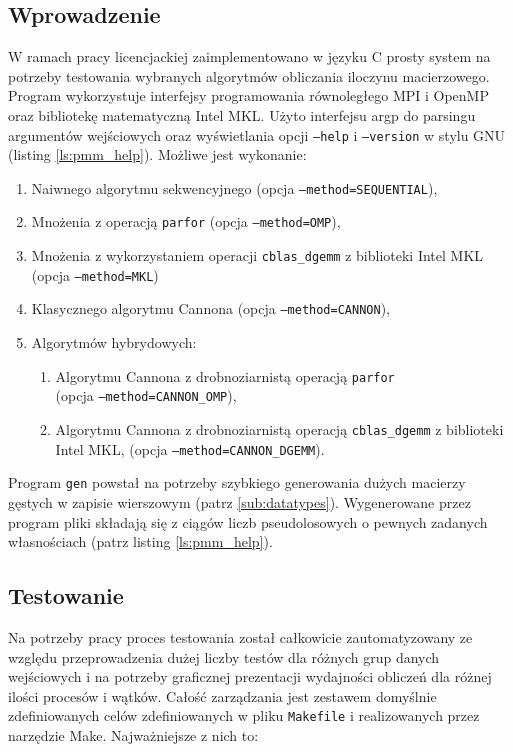 \subsection{Wprowadzenie}
W ramach pracy licencjackiej zaimplementowano w języku C prosty system na potrzeby testowania wybranych algorytmów obliczania iloczynu macierzowego. Program wykorzystuje interfejsy programowania równoległego MPI i OpenMP oraz bibliotekę matematyczną Intel MKL. Użyto interfejsu argp do parsingu argumentów wejściowych oraz wyświetlania opcji \texttt{--help} i \texttt{--version} w stylu GNU (listing \ref{ls:pmm_help}). Możliwe jest wykonanie:
\begin{enumerate}
\item Naiwnego algorytmu sekwencyjnego (opcja \texttt{--method=SEQUENTIAL}),
\item Mnożenia z operacją \texttt{parfor} (opcja \texttt{--method=OMP}),
\item Mnożenia z wykorzystaniem operacji \texttt{cblas\_dgemm} z biblioteki Intel MKL (opcja \texttt{--method=MKL})
\item Klasycznego algorytmu Cannona (opcja \texttt{--method=CANNON}),
\item Algorytmów hybrydowych:
\begin{enumerate}
\item Algorytmu Cannona z drobnoziarnistą operacją \texttt{parfor} \\ (opcja \texttt{--method=CANNON\_OMP}), 
\item Algorytmu Cannona z drobnoziarnistą operacją \texttt{cblas\_dgemm} z biblioteki Intel MKL, (opcja \texttt{--method=CANNON\_DGEMM}).
\end{enumerate}
\end{enumerate}

Program \texttt{gen} powstał na potrzeby szybkiego generowania dużych macierzy gęstych w zapisie wierszowym (patrz \ref{sub:datatypes}). Wygenerowane przez program pliki składają się z ciągów liczb pseudolosowych o pewnych zadanych własnościach (patrz listing \ref{ls:pmm_help}). 


\subsection{Testowanie}
Na potrzeby pracy proces testowania został całkowicie zautomatyzowany ze względu przeprowadzenia dużej liczby testów dla różnych grup danych wejściowych i na potrzeby graficznej prezentacji wydajności obliczeń dla różnej ilości procesów i wątków. Całość zarządzania jest zestawem domyślnie zdefiniowanych celów zdefiniowanych w pliku \texttt{Makefile} i realizowanych przez narzędzie Make. Najważniejsze z nich to:
\vspace{5mm}


